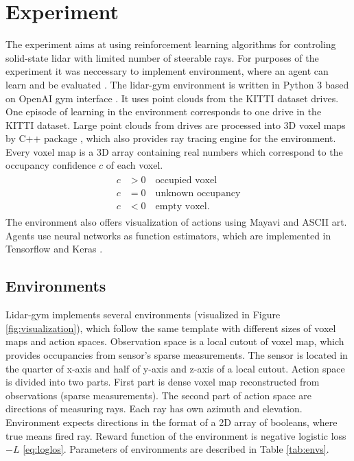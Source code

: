 \section{Experiment}
The experiment aims at using reinforcement learning algorithms for controling solid-state lidar with limited number of steerable rays. For purposes of the experiment it was neccessary to implement environment, where an agent can learn and be evaluated \cite{rozsypalek2018}. The lidar-gym environment is written in Python 3 based on OpenAI gym interface \cite{openai2016}. It uses point clouds from the KITTI dataset drives\cite{geiger2013}. One episode of learning in the environment corresponds to one drive in the KITTI dataset. Large point clouds from drives are processed into 3D voxel maps by C++ package \cite{petricek2017}, which also provides ray tracing engine for the environment. Every voxel map is a 3D array containing real numbers which correspond to the occupancy confidence $c$ of each voxel.
\begin{align}
\begin{split}
c &> 0 \quad \text{occupied voxel} \\
c &= 0 \quad \text{unknown occupancy} \\
c &< 0 \quad \text{empty voxel.}
\end{split}
\end{align}
The environment also offers visualization of actions using Mayavi \cite{mayavi2011} and ASCII art. Agents use neural networks as function estimators, which are implemented in Tensorflow \cite{tensorflow2015} and Keras \cite{keras2015}.

\subsection{Environments}
Lidar-gym implements several environments (visualized in Figure \ref{fig:visualization}), which follow the same template with different sizes of voxel maps and action spaces. Observation space is a local cutout of voxel map, which provides occupancies from sensor's sparse measurements. The sensor is located in the quarter of x-axis and half of y-axis and z-axis of a local cutout. Action space is divided into two parts. First part is dense voxel map reconstructed from observations (sparse measurements). The second part of action space are directions of measuring rays. Each ray has own azimuth and elevation. Environment expects directions in the format of a 2D array of booleans, where true means fired ray. Reward function of the environment is negative logistic loss $-L$ \eqref{eq:loglos}. Parameters of environments are described in Table \ref{tab:envs}.


